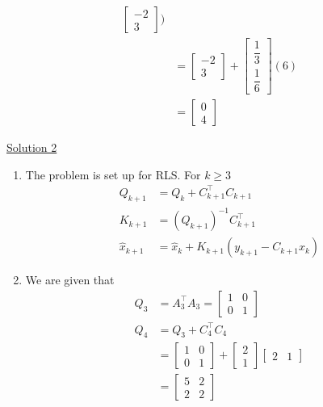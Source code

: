 \documentclass[letterpaper]{article}
\begin{document}
\begin{enumerate}
\begin{enumerate}
$$\begin{aligned}
\begin{bmatrix}
-2 \\ 3\end{bmatrix})\\
&= \begin{bmatrix} -2 \\ 3\end{bmatrix} + \begin{bmatrix}
\dfrac{1}{3} \\[2ex] \dfrac{1}{6} \end{bmatrix} (6)\\
&= \begin{bmatrix} 0 \\ 4 \end{bmatrix}
\end{aligned}$$
\end{enumerate}
\underline{Solution 2}
\begin{enumerate}
\setlength{\itemsep}{.1in}
\renewcommand{\labelenumi}{(\alph{enumi})}
\item The problem is set up for RLS. For $k \geq 3$
$$\begin{aligned}
Q_{k+1} &= Q_{k} + C_{k+1}^\top C_{k+1}\\
K_{k+1} &= (Q_{k+1})^{-1}C_{k+1}^\top\\
\hat{x}_{k+1} &= \hat{x}_k +K_{k+1}(y_{k+1}-C_{k+1}\hat{x}_k)\end{aligned}$$

\item We are given that
$$\begin{aligned}
Q_3 &= A_3^\top A_3 = \left[\begin{array}{cc} 1 & 0 \\ 0 & 1 \end{array}\right] \\
Q_4 &= Q_3 + C_4^\top C_4 \\
&= \left[\begin{array}{cc} 1 & 0 \\ 0 & 1\end{array}\right] + \begin{bmatrix} 2 \\ 1 \end{bmatrix} \left[\begin{array}{cc}2 & 1\end{array}\right]\\
&= \left[\begin{array}{cc} 5 & 2 \\ 2 & 2\end{array}\right]
\end{aligned}$$


\end{enumerate}
\end{enumerate}
\end{document}
